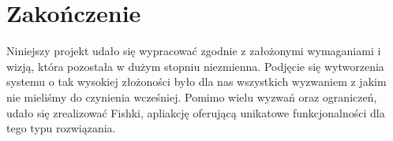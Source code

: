 \section{Zakończenie}
Niniejszy projekt udało się wypracować zgodnie z założonymi wymaganiami i wizją, która pozostała w dużym stopniu niezmienna. Podjęcie się wytworzenia systemu o tak wysokiej złożoności było dla nas wszystkich wyzwaniem z jakim nie mieliśmy do czynienia wcześniej. Pomimo wielu wyzwań oraz ograniczeń, udało się zrealizować Fishki, apliakcję oferującą unikatowe funkcjonalności dla tego typu rozwiązania.
